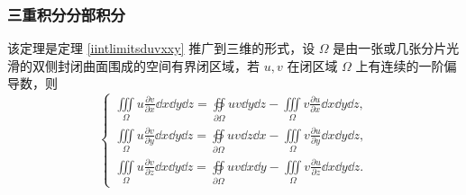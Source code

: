 \subsubsection{三重积分分部积分}

\begin{theorem}[三重积分分部积分公式]
    该定理是定理 \ref{iintlimitsduvxxy} 推广到三维的形式，设 $\Omega$ 是由一张或几张分片光滑的双侧封闭曲面围成的空间有界闭区域，若 $u,v$ 在闭区域 $\Omega$ 上有连续的一阶偏导数，则
    $$\begin{cases}
            \displaystyle\iiint\limits_\Omega u\frac{\partial v}{\partial x}\dd x\dd y\dd z=\oiint\limits_{\partial \Omega}uv\dd y\dd z-\iiint\limits_\Omega v\frac{\partial u}{\partial x}\dd x\dd y\dd z, \\[6pt]
            \displaystyle\iiint\limits_\Omega u\frac{\partial v}{\partial y}\dd x\dd y\dd z=\oiint\limits_{\partial \Omega}uv\dd z\dd x-\iiint\limits_\Omega v\frac{\partial u}{\partial y}\dd x\dd y\dd z, \\[6pt]
            \displaystyle\iiint\limits_\Omega u\frac{\partial v}{\partial z}\dd x\dd y\dd z=\oiint\limits_{\partial \Omega}uv\dd x\dd y-\iiint\limits_\Omega v\frac{\partial u}{\partial z}\dd x\dd y\dd z.
        \end{cases}$$
\end{theorem}

